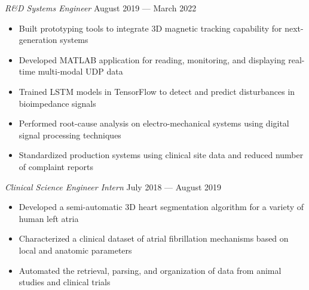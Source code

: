 \documentclass{article}
\begin{document}
\textit{R\&D Systems Engineer} \hfill August 2019 --- March 2022\\
\vspace{-2mm}
\begin{itemize} \itemsep 0.05pt
	\item Built prototyping tools to integrate 3D magnetic tracking capability for next-generation systems
	\item Developed MATLAB application for reading, monitoring, and displaying real-time multi-modal UDP data
	\item Trained LSTM models in TensorFlow to detect and predict disturbances in bioimpedance signals
	\item Performed root-cause analysis on electro-mechanical systems using digital signal processing techniques
	\item Standardized production systems using clinical site data and reduced number of complaint reports
\end{itemize}

\textit{Clinical Science Engineer Intern} \hfill July 2018 --- August 2019\\
\vspace{-2mm}
\begin{itemize} \itemsep 0.05pt
	\item Developed a semi-automatic 3D heart segmentation algorithm for a variety of human left atria
	\item Characterized a clinical dataset of atrial fibrillation mechanisms based on local and anatomic parameters
	\item Automated the retrieval, parsing, and organization of data from animal studies and clinical trials
\end{itemize}

\end{document}

